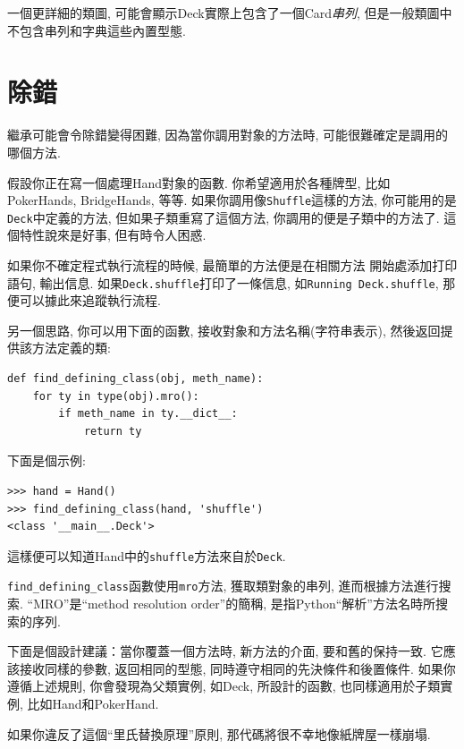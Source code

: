 \documentclass[10pt]{book}
\begin{document}
一個更詳細的類圖, 可能會顯示Deck實際上包含了一個Card{\em 串列}, 
但是一般類圖中不包含串列和字典這些內置型態. 

\section{除錯}

繼承可能會令除錯變得困難, 因為當你調用對象的方法時, 
可能很難確定是調用的哪個方法. 

假設你正在寫一個處理Hand對象的函數. 
你希望適用於各種牌型, 比如PokerHands, BridgeHands, 等等. 
如果你調用像{\tt Shuffle}這樣的方法, 
你可能用的是{\tt Deck}中定義的方法, 
但如果子類重寫了這個方法, 
你調用的便是子類中的方法了. 
這個特性說來是好事, 但有時令人困惑. 

如果你不確定程式執行流程的時候, 最簡單的方法便是在相關方法
開始處添加打印語句, 輸出信息. 
如果{\tt Deck.shuffle}打印了一條信息, 如{\tt Running Deck.shuffle}, 
那便可以據此來追蹤執行流程. 

另一個思路, 你可以用下面的函數, 接收對象和方法名稱(字符串表示), 
然後返回提供該方法定義的類:

\begin{verbatim}
def find_defining_class(obj, meth_name):
    for ty in type(obj).mro():
        if meth_name in ty.__dict__:
            return ty
\end{verbatim}
%
下面是個示例:

\begin{verbatim}
>>> hand = Hand()
>>> find_defining_class(hand, 'shuffle')
<class '__main__.Deck'>
\end{verbatim}
%
這樣便可以知道Hand中的{\tt shuffle}方法來自於{\tt Deck}.

\verb"find_defining_class"函數使用{\tt mro}方法, 獲取類對象的串列, 
進而根據方法進行搜索. 
``MRO''是``method resolution order''的簡稱, 
是指Python``解析''方法名時所搜索的序列.

下面是個設計建議：當你覆蓋一個方法時, 
新方法的介面, 要和舊的保持一致. 
它應該接收同樣的參數, 返回相同的型態, 
同時遵守相同的先決條件和後置條件. 
如果你遵循上述規則, 你會發現為父類實例, 如Deck, 所設計的函數, 
也同樣適用於子類實例, 比如Hand和PokerHand. 


如果你違反了這個``里氏替換原理''原則, 
那代碼將很不幸地像紙牌屋一樣崩塌. 
\end{document}
